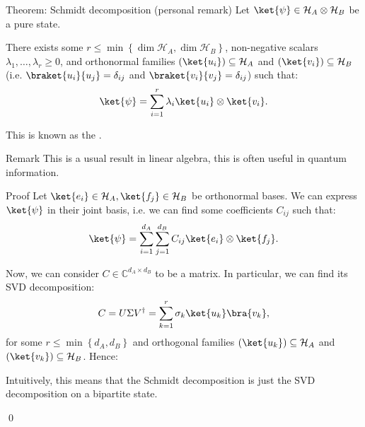\documentclass[a4paper]{article}
\begin{document}
\begin{parag}{Theorem: Schmidt decomposition (personal remark)}
    Let $\ket{\psi} \in \mathcal{H}_A \otimes \mathcal{H}_B$ be a pure state. 

    There exists some $r \leq \min\left\{\dim \mathcal{H}_A, \dim \mathcal{H}_B\right\}$, non-negative scalars $\lambda_1, \ldots, \lambda_r \geq 0$, and orthonormal families $\left(\ket{u_i}\right) \subseteq \mathcal{H}_A$ and $\left(\ket{v_i}\right) \subseteq \mathcal{H}_B$ (i.e. $\braket{u_i}{u_j} = \delta_{ij}$ and $\braket{v_i}{v_j} = \delta_{ij}$) such that: 
    \[\ket{\psi} = \sum_{i=1}^{r} \lambda_i \ket{u_i} \otimes \ket{v_i}.\]

    This is known as the .

    \begin{subparag}{Remark}
        This is a usual result in linear algebra, this is often useful in quantum information.
    \end{subparag}

    \begin{subparag}{Proof}
        Let $\ket{e_i} \in \mathcal{H}_A, \ket{f_j} \in \mathcal{H}_B$ be orthonormal bases. We can express $\ket{\psi}$ in their joint basis, i.e. we can find some coefficients $C_{ij}$ such that: 
        \[\ket{\psi} = \sum_{i=1}^{d_A} \sum_{j=1}^{d_B} C_{ij} \ket{e_i} \otimes \ket{f_j}.\]
        
        Now, we can consider $C \in \mathbb{C}^{d_A \times d_B}$ to be a matrix. In particular, we can find its SVD decomposition: 
        \[C = U \Sigma V^{\dagger} = \sum_{k=1}^{r} \sigma_k \ket{u_k}\bra{v_k},\]
        for some $r \leq \min\left\{d_A, d_B\right\}$ and orthogonal families $\left(\ket{u_k}\right) \subseteq \mathcal{H}_A$ and $\left(\ket{v_k}\right) \subseteq \mathcal{H}_B$. Hence: 

        Intuitively, this means that the Schmidt decomposition is just the SVD decomposition on a bipartite state.

        \qed
    \end{subparag}
\end{parag}
\end{document}
